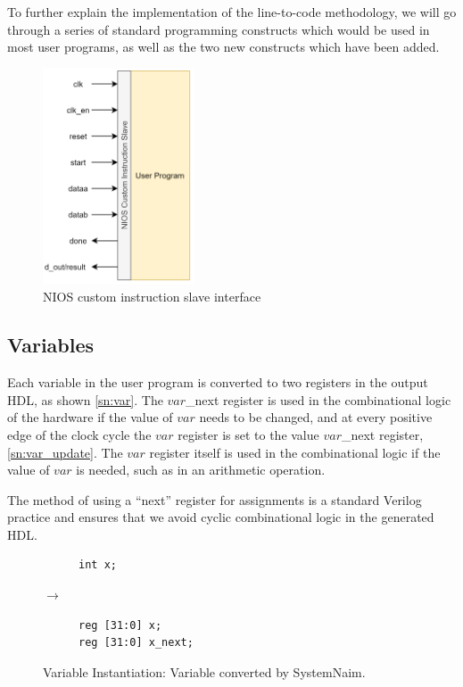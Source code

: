 To further explain the implementation of the line-to-code methodology, we will go through a series of standard programming constructs which would be used in most user programs, as well as the two new constructs which have been added.

\begin{figure}[!htb]
    \centering
    \includegraphics[width=0.4\textwidth]{04_Implementation/images/custom_instr_interface.png}
    \caption{NIOS custom instruction slave interface}
    \label{fig:nios_instr}
\end{figure}

\subsection{Variables}
\label{sn:var_sections}

Each variable in the user program is converted to two registers in the output HDL, as shown \autoref{sn:var}. The $var$\_next register is used in the combinational logic of the hardware if the value of $var$ needs to be changed, and at every positive edge of the clock cycle the $var$ register is set to the value $var$\_next register, \autoref{sn:var_update}. The $var$ register itself is used in the combinational logic if the value of $var$ is needed, such as in an arithmetic operation.

The method of using a “next” register for assignments is a standard Verilog practice and ensures that we avoid cyclic combinational logic in the generated HDL. 

\begin{figure}[H]
\centering
\begin{subfigure}{0.15\textwidth}
    \centering
    \begin{verbatim}
int x;
    \end{verbatim}
\end{subfigure}%
{\LARGE$\rightarrow$}%
\begin{subfigure}{0.3\textwidth}
    \begin{verbatim}
reg [31:0] x;
reg [31:0] x_next;
    \end{verbatim}
\end{subfigure}
\caption{Variable Instantiation: Variable converted by SystemNaim.}
\label{sn:var}
\end{figure}

